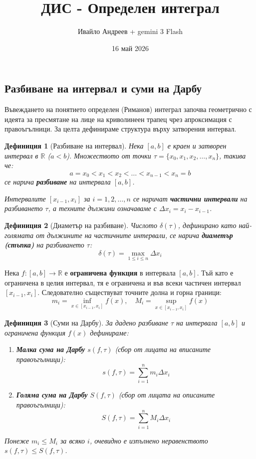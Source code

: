 \documentclass{scrartcl}
\title{ДИС - Определен интеграл}
\author{Ивайло Андреев + gemini 3 Flash}
\date{16 май 2026}
\newtheorem{definition}{Дефиниция}
\begin{document}
\maketitle

\tableofcontents

\newpage

\begin{FlushLeft}

\section{Разбиване на интервал и суми на Дарбу}

Въвеждането на понятието определен (Риманов) интеграл започва геометрично с идеята за пресмятане на лице на криволинеен трапец чрез апроксимация с правоъгълници. За целта дефинираме структура върху затворения интервал.

\begin{definition}[Разбиване на интервал]
Нека $[a, b]$ е краен и затворен интервал в $\mathbb{R}$ ($a < b$). Множеството от точки $\tau = \{x_0, x_1, x_2, \dots, x_n\}$, такива че:
\[ a = x_0 < x_1 < x_2 < \dots < x_{n-1} < x_n = b \]
се нарича \textbf{разбиване} на интервала $[a, b]$. 

Интервалите $[x_{i-1}, x_i]$ за $i = 1, 2, \dots, n$ се наричат \textbf{частични интервали} на разбиването $\tau$, а техните дължини означаваме с $\Delta x_i = x_i - x_{i-1}$.
\end{definition}

\begin{definition}[Диаметър на разбиване]
Числото $\delta(\tau)$, дефинирано като най-голямата от дължините на частичните интервали, се нарича \textbf{диаметър (стъпка)} на разбиването $\tau$:
\[ \delta(\tau) = \max_{1 \le i \le n} \Delta x_i \]
\end{definition}

Нека $f: [a, b] \to \mathbb{R}$ е \textbf{ограничена функция} в интервала $[a, b]$. Тъй като е ограничена в целия интервал, тя е ограничена и във всеки частичен интервал $[x_{i-1}, x_i]$. Следователно съществуват точните долна и горна граници:
\[ m_i = \inf_{x \in [x_{i-1}, x_i]} f(x), \quad M_i = \sup_{x \in [x_{i-1}, x_i]} f(x) \]

\begin{definition}[Суми на Дарбу]
За дадено разбиване $\tau$ на интервала $[a, b]$ и ограничена функция $f(x)$ дефинираме:
\begin{enumerate}
    \item \textbf{Малка сума на Дарбу} $s(f, \tau)$ (сбор от лицата на вписаните правоъгълници):
    \[ s(f, \tau) = \sum_{i=1}^{n} m_i \Delta x_i \]
    \item \textbf{Голяма сума на Дарбу} $S(f, \tau)$ (сбор от лицата на описаните правоъгълници):
    \[ S(f, \tau) = \sum_{i=1}^{n} M_i \Delta x_i \]
\end{enumerate}
Понеже $m_i \le M_i$ за всяко $i$, очевидно е изпълнено неравенството $s(f, \tau) \le S(f, \tau)$.
\end{definition}


\end{FlushLeft}
\end{document}
